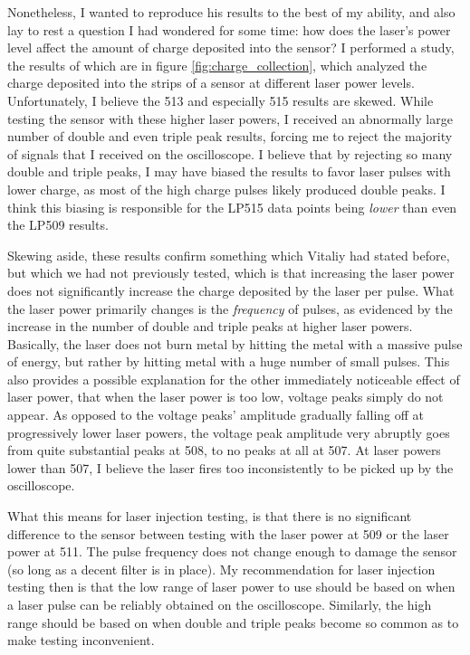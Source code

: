 \documentclass{report}
\begin{document}
            Nonetheless, I wanted to reproduce his results to the best of my ability, and also lay to rest a question I had wondered for some time: how does the laser's power level affect the amount of charge deposited into the sensor? I performed a study, the results of which are in figure \ref{fig:charge_collection}, which analyzed the charge deposited into the strips of a sensor at different laser power levels. Unfortunately, I believe the 513 and especially 515 results are skewed. While testing the sensor with these higher laser powers, I received an abnormally large number of double and even triple peak results, forcing me to reject the majority of signals that I received on the oscilloscope. I believe that by rejecting so many double and triple peaks, I may have biased the results to favor laser pulses with lower charge, as most of the high charge pulses likely produced double peaks. I think this biasing is responsible for the LP515 data points being \textit{lower} than even the LP509 results.

            Skewing aside, these results confirm something which Vitaliy had stated before, but which we had not previously tested, which is that increasing the laser power does not significantly increase the charge deposited by the laser per pulse. What the laser power primarily changes is the \textit{frequency} of pulses, as evidenced by the increase in the number of double and triple peaks at higher laser powers. Basically, the laser does not burn metal by hitting the metal with a massive pulse of energy, but rather by hitting metal with a huge number of small pulses. This also provides a possible explanation for the other immediately noticeable effect of laser power, that when the laser power is too low, voltage peaks simply do not appear. As opposed to the voltage peaks' amplitude gradually falling off at progressively lower laser powers, the voltage peak amplitude very abruptly goes from quite substantial peaks at 508, to no peaks at all at 507. At laser powers lower than 507, I believe the laser fires too inconsistently to be picked up by the oscilloscope.
            
            What this means for laser injection testing, is that there is no significant difference to the sensor between testing with the laser power at 509 or the laser power at 511. The pulse frequency does not change enough to damage the sensor (so long as a decent filter is in place). My recommendation for laser injection testing then is that the low range of laser power to use should be based on when a laser pulse can be reliably obtained on the oscilloscope. Similarly, the high range should be based on when double and triple peaks become so common as to make testing inconvenient.

            
            


        
    
\end{document}
